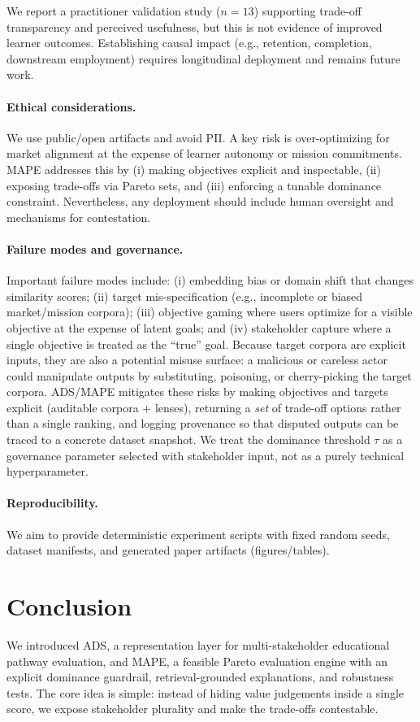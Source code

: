 \documentclass{article}
\newif\ifdraft      %
\newcommand{\draftonly}[1]{\ifdraft #1\fi}
\newcommand{\todo}[1]{\textcolor{red}{\textbf{[TODO: #1]}}}
\newcommand{\todo}[1]{}
\newcommand{\ADS}{\textsc{ADS}\xspace}
\newcommand{\MAPE}{\textsc{MAPE}\xspace}
\begin{document}
We report a practitioner validation study ($n{=}13$) supporting trade-off transparency and perceived usefulness, but this is not evidence of improved learner outcomes. Establishing causal impact (e.g., retention, completion, downstream employment) requires longitudinal deployment and remains future work.

\paragraph{Ethical considerations.}
We use public/open artifacts and avoid PII. A key risk is over-optimizing for market alignment at the expense of learner autonomy or mission commitments. \MAPE addresses this by (i) making objectives explicit and inspectable, (ii) exposing trade-offs via Pareto sets, and (iii) enforcing a tunable dominance constraint. Nevertheless, any deployment should include human oversight and mechanisms for contestation.

\paragraph{Failure modes and governance.}
Important failure modes include: (i) {embedding bias} or domain shift that changes similarity scores; (ii) {target mis-specification} (e.g., incomplete or biased market/mission corpora); (iii) {objective gaming} where users optimize for a visible objective at the expense of latent goals; and (iv) {stakeholder capture} where a single objective is treated as the ``true'' goal. Because target corpora are explicit inputs, they are also a potential misuse surface: a malicious or careless actor could manipulate outputs by substituting, poisoning, or cherry-picking the target corpora. \ADS/\MAPE mitigates these risks by making objectives and targets explicit (auditable corpora + lenses), returning a \emph{set} of trade-off options rather than a single ranking, and logging provenance so that disputed outputs can be traced to a concrete dataset snapshot. We treat the dominance threshold $\tau$ as a governance parameter selected with stakeholder input, not as a purely technical hyperparameter.

\paragraph{Reproducibility.}
We aim to provide deterministic experiment scripts with fixed random seeds, dataset manifests, and generated paper artifacts (figures/tables). \draftonly{\todo{Add concrete commands + seeds once repo is frozen.}}



\section{Conclusion}
We introduced \ADS, a representation layer for multi-stakeholder educational pathway evaluation, and \MAPE, a feasible Pareto evaluation engine with an explicit dominance guardrail, retrieval-grounded explanations, and robustness tests. The core idea is simple: instead of hiding value judgements inside a single score, we expose stakeholder plurality and make the trade-offs contestable.




\end{document}
